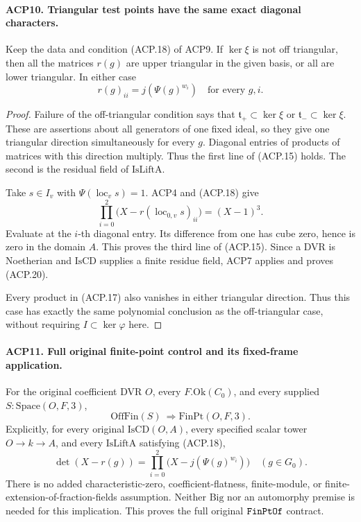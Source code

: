 \documentclass[11pt,a4paper]{article}
\numberwithin{equation}{section}
\theoremstyle{remark}\newtheorem{remark}[theorem]{Remark}
\begin{document}
\paragraph{ACP10. Triangular test points have the same exact diagonal characters.}
\label{claim:ACP10}
Keep the data and condition (ACP.18) of ACP9.  If \(\ker\xi\)
is not off triangular, then all the matrices \(r(g)\) are
upper triangular in the given basis, or all are lower triangular.
In either case
\[
                 r(g)_{ii}=j(\Psi(g)^{w_i})
                 \quad\text{for every }g,i.
                                                        \tag{ACP.20}
\]

\begin{proof}
Failure of the off-triangular condition says that
\(\mathfrak t_+\subset\ker\xi\) or
\(\mathfrak t_-\subset\ker\xi\).  These are assertions
about all generators of one fixed ideal, so they give one
triangular direction simultaneously for every \(g\).
Diagonal entries of products of matrices with this direction
multiply.  Thus the first line of (ACP.15) holds.
The second is the residual field of \(\mathrm{IsLiftA}\).

Take \(s\in I_v\) with \(\Psi(\operatorname{loc}_v s)=1\).
ACP4 and (ACP.18) give
\[
 \prod_{i=0}^2\bigl(X-r(\operatorname{loc}_{0,v}s)_{ii}\bigr)
                                                    =(X-1)^3.
\]
Evaluate at the \(i\)-th diagonal entry.  Its difference from
one has cube zero, hence is zero in the domain \(A\).
This proves the third line of (ACP.15).  Since a DVR is
Noetherian and \(\mathrm{IsCD}\) supplies a finite residue
field, ACP7 applies and proves (ACP.20).

Every product in (ACP.17) also vanishes in either triangular
direction.  Thus this case has exactly the same polynomial
conclusion as the off-triangular case, without requiring
\(I\subset\ker\varphi\) here.
\end{proof}

\paragraph{ACP11. Full original finite-point control and its fixed-frame application.}
\label{claim:ACP11}
For the original coefficient DVR \(O\), every
\(F.\mathrm{Ok}(C_0)\), and every supplied
\(S:\mathrm{Space}(O,F,3)\),
\[
               \mathrm{OffFin}(S)\ \Longrightarrow
                         \mathrm{FinPt}(O,F,3).
                                                        \tag{ACP.21}
\]
Explicitly, for every original \(\mathrm{IsCD}(O,A)\), every
specified scalar tower \(O\to k\to A\), and every
\(\mathrm{IsLiftA}\) satisfying (ACP.18),
\[
 \det(X-r(g))=
   \prod_{i=0}^2\bigl(X-j(\Psi(g)^{w_i})\bigr)
                            \quad(g\in G_0).
                                                        \tag{ACP.22}
\]
There is no added characteristic-zero, coefficient-flatness,
finite-module, or finite-extension-of-fraction-fields assumption.
Neither \(\mathrm{Big}\) nor an automorphy premise is needed
for this implication.  This proves the full original
\(\texttt{Fin\allowbreak Pt\allowbreak Of}\) contract.
\end{document}
